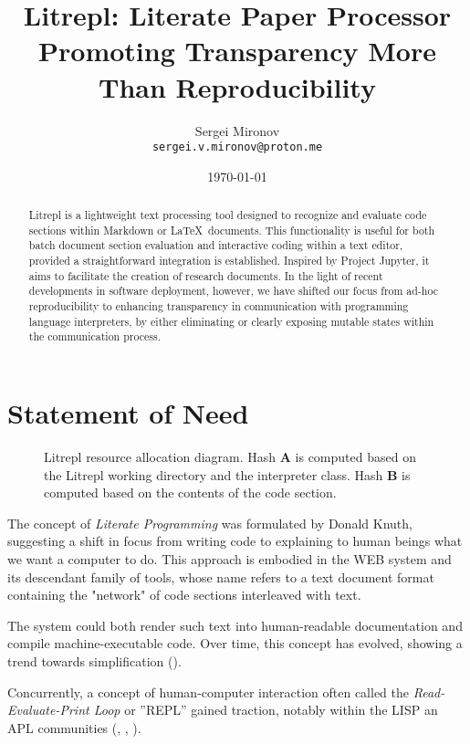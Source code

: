 \documentclass[letterpaper,12pt,twocolumn]{article}
\title{Litrepl: Literate Paper Processor Promoting Transparency More Than Reproducibility}
\author{Sergei Mironov \\
        \texttt{sergei.v.mironov@proton.me}}
\date{\today}
\newcommand{\Latex}{\LaTeX\ }
\begin{document}
\maketitle

\begin{abstract}

Litrepl is a lightweight text processing tool designed to recognize and evaluate
code sections within Markdown or \Latex documents. This functionality is useful
for both batch document section evaluation and interactive coding within a text
editor, provided a straightforward integration is established. Inspired by
Project Jupyter, it aims to facilitate the creation of research documents. In
the light of recent developments in software deployment, however, we have
shifted our focus from ad-hoc reproducibility to enhancing transparency in
communication with programming language interpreters, by either eliminating or
clearly exposing mutable states within the communication process.

\end{abstract}

\section{Statement of Need}

\begin{figure*}[!hbt]
  \centering
  
  \caption{Litrepl resource allocation diagram. Hash \textbf{A} is computed
  based on the Litrepl working directory and the interpreter class. Hash
  \textbf{B} is computed based on the contents of the code section.}
  \label{fig:resource-allocation}
\end{figure*}

The concept of \textit{Literate Programming} was formulated by Donald Knuth,
suggesting a shift in focus from writing code to explaining to human beings what
we want a computer to do. This approach is embodied in the WEB
system\cite{Knuth1984lp} and its descendant family of tools, whose name refers
to a text document format containing the "network" of code sections interleaved
with text.

The system could both render such text into human-readable documentation and
compile machine-executable code. Over time, this concept has evolved, showing a
trend towards simplification (\textcite{Ramsey1994lps}).

Concurrently, a concept of human-computer interaction often called the
\textit{Read-Evaluate-Print Loop} or ''REPL'' gained traction, notably within
the LISP an APL communities (\textcite{Spence1975apl},
\textcite{McCarthy1959recfun}, \textcite{Iverson1962apl}).
\end{document}
